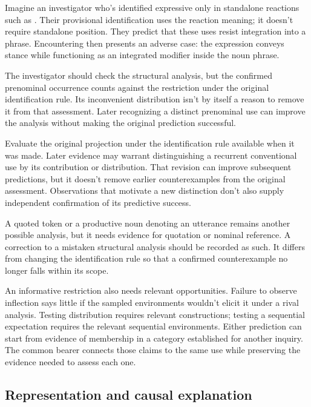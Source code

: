 \documentclass[12pt]{article}
\begin{document}
Imagine an investigator who's identified expressive 
only in standalone reactions such as . Their provisional identification uses the reaction meaning;
it doesn't require standalone position. They predict that these uses
resist integration into a phrase. Encountering  then presents an adverse case: the expression conveys stance
while functioning as an integrated modifier inside the noun phrase.

The investigator should check the structural analysis, but the confirmed
prenominal occurrence counts against the restriction under the original
identification rule. Its inconvenient distribution isn't by itself a
reason to remove it from that assessment. Later recognizing a distinct
prenominal use can improve the analysis without making the original
prediction successful.

Evaluate the original projection under the identification rule available
when it was made. Later evidence may warrant distinguishing a recurrent
conventional use by its contribution or distribution. That revision
can improve subsequent predictions, but it doesn't remove earlier
counterexamples from the original assessment. Observations that motivate
a new distinction don't also supply independent confirmation of its
predictive success.

A quoted token or a productive noun denoting an utterance remains
another possible analysis, but it needs evidence for quotation or
nominal reference. A correction to a mistaken structural analysis should
be recorded as such. It differs from changing the identification rule
so that a confirmed counterexample no longer falls within its scope.

An informative restriction also needs relevant opportunities. Failure
to observe inflection says little if the sampled environments wouldn't
elicit it under a rival analysis. Testing distribution requires relevant
constructions; testing a sequential expectation requires the relevant
sequential environments. Either prediction can start from evidence
of membership in a category established for another inquiry. The common
bearer connects those claims to the same use while preserving the
evidence needed to assess each one.

\subsection{Representation and causal explanation}
\end{document}
